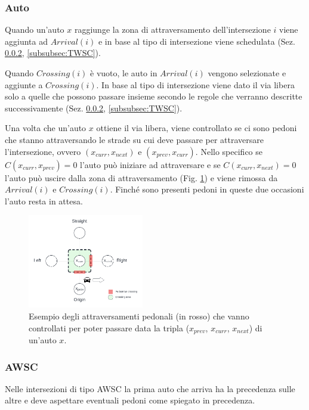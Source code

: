 \subsubsection{Auto}
Quando un'auto $x$ raggiunge la zona di attraversamento dell'intersezione $i$ viene aggiunta ad $\textit{Arrival}(i)$ e
in base al tipo di intersezione viene schedulata (Sez. \ref{subsubsec:AWSC}, \ref{subsubsec:TWSC}).

Quando $\textit{Crossing}(i)$ è vuoto, le auto in $\textit{Arrival}(i)$ vengono selezionate e aggiunte a $\textit{Crossing}(i)$. In base al tipo di
intersezione viene dato il via libera solo a quelle che possono passare insieme secondo le regole che verranno descritte successivamente (Sez. \ref{subsubsec:AWSC}, \ref{subsubsec:TWSC}).

%
Una volta che un'auto $x$ ottiene il via libera, viene controllato se ci sono pedoni che stanno attraversando le strade
su cui deve passare per attraversare l'intersezione, ovvero $(x_{curr}, x_{next})$ e $(x_{prev}, x_{curr})$.
Nello specifico se $C(x_{curr},x_{prev}) = 0$ l'auto può iniziare ad attraversare e se $C(x_{curr},x_{next}) = 0$
l'auto può uscire dalla zona di attraversamento (Fig. \ref{fig:auto-ped-crossing}) e viene rimossa da $\textit{Arrival}(i)$ e $\textit{Crossing}(i)$.
Finché sono presenti pedoni in queste due occasioni l'auto resta in attesa.

\begin{figure}[ht]
    \centering
    \includegraphics[width=0.45\textwidth]{images/crossing_auto_ped_crossing}
    \caption{Esempio degli attraversamenti pedonali (in rosso) che vanno controllati
        per poter passare data la tripla ($x_{prev}$, $x_{curr}$, $x_{next}$) di un'auto $x$.}
    \label{fig:auto-ped-crossing}
\end{figure}

\subsubsection{AWSC}
\label{subsubsec:AWSC}
Nelle intersezioni di tipo AWSC la prima auto che arriva ha la precedenza sulle altre e deve aspettare eventuali pedoni come spiegato in precedenza.

